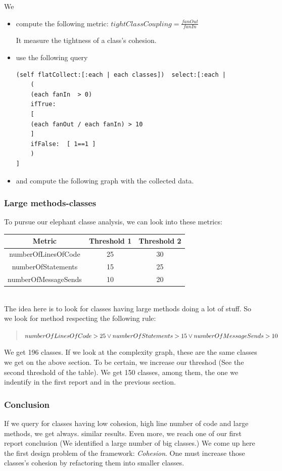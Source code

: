 \documentclass[11pt,a4paper]{article}
\begin{document}
We 
\begin{itemize}

\item compute the following metric:
$tightClassCoupling = \frac{fanOut}{fanIn}$

It measure the tightness of a class's cohesion.
\item use the following query
\begin{lstlisting}
(self flatCollect:[:each | each classes])  select:[:each | 
	(
	(each fanIn  > 0)  
	ifTrue: 
	[
	(each fanOut / each fanIn) > 10
	]
	ifFalse:  [ 1==1 ]
	)
]
\end{lstlisting}
\item and compute the following graph with the collected data.
\end{itemize} 
\subsubsection{Large methods-classes}
To pursue our elephant classe analysis, we can look into these metrics:\\
\begin{tabular}{| c | c | c |}
\hline
Metric & Threshold 1 & Threshold 2\\
\hline
numberOfLinesOfCode & 25 & 30\\
\hline
numberOfStatements & 15 & 25\\
\hline
numberOfMessageSends & 10 & 20\\
\hline
\end{tabular}\\

The idea here is to look for classes having large methods doing a lot of stuff. So we look for method respecting the following rule:

\begin{quote} $ numberOfLinesOfCode > 25 \\ \vee numberOfStatements > 15 \\ \vee numberOfMessageSends > 10$\\\end{quote}

We get 196 classes. If we look at the complexity graph, these are the same classes we get on the above section. To be certain, we increase our threshod (See the second threshold of the table). We get 150 classes, among them, the one we indentify in the first report and in the previous section. 
\subsubsection{Conclusion}
If we query for classes having low cohesion, high line number of code and large methods, we get always. similar results. Even more, we reach one of our first report conclusion (We identified a large number of big classes.) We come up here the first design problem of the framework: \emph{Cohesion}. One must increase those classes's cohesion by refactoring them into smaller classes.\\
\end{document}
